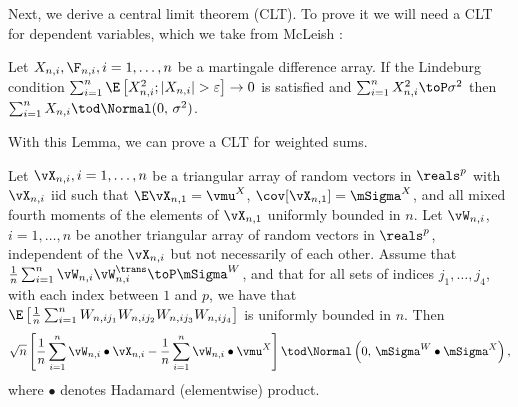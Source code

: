 Next, we derive a central limit theorem (CLT).  To prove it we will need a
CLT for dependent variables, which we take from McLeish \cite{mcleish1974dcl}:

\begin{lemma}\label{L:mcleigh}
    Let $X_{n,i}, \F_{n,i}, i = 1, \ldots, n$ be a martingale difference 
    array.  If the Lindeburg condition 
    $\sum_{i=1}^n \E \left[ X_{n,i}^2 ; | X_{n,i} | > \varepsilon \right] \to 0$
    is satisfied and $\sum_{i=1}^n X_{n,i}^2 \toP \sigma^2$ then
    $\sum_{i=1}^n X_{n,i} \tod \Normal (0, \, \sigma^2)$.
\end{lemma}

\noindent
With this Lemma, we can prove a CLT for weighted sums.

\begin{proposition}\label{P:weighted-clt}
    Let $\vX_{n,i}, i = 1, \ldots, n$ be a triangular array of random vectors
    in $\reals^p$ with $\vX_{n,i}$ iid
    such that $\E \vX_{n,1} = \vmu^X$, $\cov[ \vX_{n,1}] = \mSigma^X$, and all 
    mixed fourth moments of the elements of $\vX_{n,1}$ uniformly bounded in 
    $n$.  Let  $\vW_{n,i}$, $i = 1, \ldots, n$ be another triangular array 
    of random 
    vectors in $\reals^p$, independent of the $\vX_{n,i}$ but not necessarily 
    of each other.  Assume that 
    $\frac{1}{n} \sum_{i=1}^n \vW_{n,i} \vW_{n,i}^\trans \toP \mSigma^W$, and 
    that for
    all sets of indices $j_1, \ldots, j_4$, with each index between $1$ and
    $p$, we have that
    \(
        \E \left[ 
            \frac{1}{n}
            \sum_{i=1}^n
                W_{n,ij_1} 
                W_{n,ij_2} 
                W_{n,ij_3} 
                W_{n,ij_4} 
        \right]
    \) is uniformly bounded in $n$.  Then
    \[
        \sqrt{n}
        \left[
            \frac{1}{n}
            \sum_{i=1}^n
                \vW_{n,i} \bullet \vX_{n,i}
            -
            \frac{1}{n} 
            \sum_{i=1}^n 
                \vW_{n,i} \bullet \vmu^X
        \right]
        \tod
        \Normal\left( 0, \, \mSigma^W \bullet \mSigma^X \right),
    \]
    where $\bullet$ denotes Hadamard (elementwise) product.
\end{proposition}
